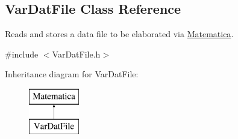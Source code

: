 \hypertarget{classVarDatFile}{}\subsection{Var\+Dat\+File Class Reference}
\label{classVarDatFile}


Reads and stores a data file to be elaborated via \hyperlink{classMatematica}{Matematica}.  




{\ttfamily \#include $<$Var\+Dat\+File.\+h$>$}

Inheritance diagram for Var\+Dat\+File\+:\begin{figure}[H]
\begin{center}
\leavevmode
\includegraphics[height=2.000000cm]{classVarDatFile}
\end{center}
\end{figure}
